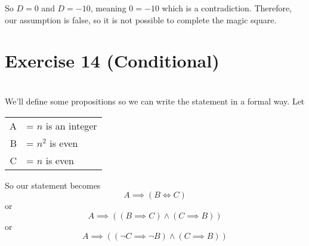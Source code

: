 \documentclass[11pt]{article}
\begin{document}
So $D=0$ and $D=-10$, meaning $0 = -10$ which is a contradiction. Therefore, our assumption is false, so it is not possible to complete the magic square.


\section*{Exercise 14 (Conditional)}
\\

We'll define some propositions so we can write the statement in a formal way. Let
\begin{center}
    \begin{tabular}{r l}
        A &= $n$ is an integer \\
        B &= $n^2$ is even \\
        C &= $n$ is even
    \end{tabular}
\end{center}


So our statement becomes
\[A \implies (B \iff C)\]
or
\[A \implies ((B \implies C) \land (C \implies B))\]
or
\[A \implies ((\lnot C \implies \lnot B) \land (C \implies B))\]
\end{document}
